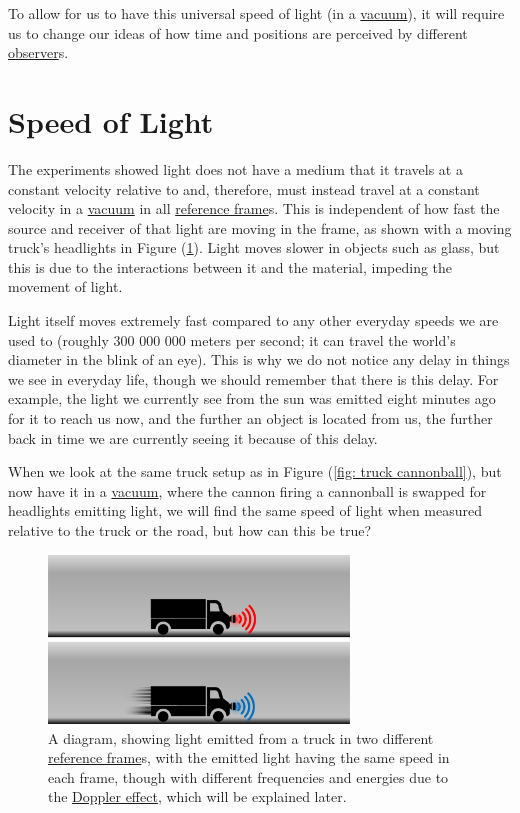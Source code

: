 To allow for us to have this universal speed of light (in a \hyperlink{def-vacuum}{vacuum}), it will require us to change our ideas of how time and positions are perceived by different \hyperlink{def-observer}{observer}s.

\section{Speed of Light} \label{sect: Speed of Light}

The experiments showed light does not have a medium that it travels at a constant velocity relative to and, therefore, must instead travel at a constant velocity in a \hyperlink{def-vacuum}{vacuum} in all \hyperlink{def-Reference-frame}{reference frame}s.
This is independent of how fast the source and receiver of that light are moving in the frame, as shown with a moving truck's headlights in Figure (\ref{fig: truck torch}).
Light moves slower in objects such as glass, but this is due to the interactions between it and the material, impeding the movement of light.

Light itself moves extremely fast compared to any other everyday speeds we are used to (roughly 300 000 000 meters per second; it can travel the world's diameter in the blink of an eye).
This is why we do not notice any delay in things we see in everyday life, though we should remember that there is this delay.
For example, the light we currently see from the sun was emitted eight minutes ago for it to reach us now, and the further an object is located from us, the further back in time we are currently seeing it because of this delay.

When we look at the same truck setup as in Figure (\ref{fig: truck cannonball}), but now have it in a \hyperlink{def-vacuum}{vacuum}, where the cannon firing a cannonball is swapped for headlights emitting light, we will find the same speed of light when measured relative to the truck or the road, but how can this be true?

\begin{figure}[H]
	\centering
	\includegraphics[width = 8cm]{images/pdf/lorry_torch.pdf}
	\caption{A diagram, showing light emitted from a truck in two different \protect\hyperlink{def-Reference-frame}{reference frame}s, with the emitted light having the same speed in each frame, though with different frequencies and energies due to the \protect\hyperlink{def-doppler-effect}{Doppler effect}, which will be explained later.}
	\label{fig: truck torch}
\end{figure}

